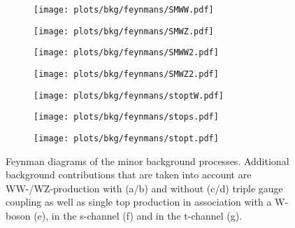\begin{figure}
	\centering
	\begin{subfigure}{0.4\textwidth}
		\texttt{[image: plots/bkg/feynmans/SMWW.pdf]}
		\caption{}
		\label{fig:bkg:fy_WWtgc}
	\end{subfigure}
	\begin{subfigure}{0.4\textwidth}
		\texttt{[image: plots/bkg/feynmans/SMWZ.pdf]}
		\caption{}
		\label{fig:bkg:fy_WZtgc}
	\end{subfigure}
	\begin{subfigure}{0.4\textwidth}
		\texttt{[image: plots/bkg/feynmans/SMWW2.pdf]}
		\caption{}
		\label{fig:bkg:fy_WWSM}
	\end{subfigure}
	\begin{subfigure}{0.4\textwidth}
		\texttt{[image: plots/bkg/feynmans/SMWZ2.pdf]}
		\caption{}
		\label{fig:bkg:fy_WZSM}
	\end{subfigure}
	\begin{subfigure}{0.3\textwidth}
		\texttt{[image: plots/bkg/feynmans/stoptW.pdf]}
		\caption{}
		\label{fig:bkg:fy_stoptw}
	\end{subfigure}
	\begin{subfigure}{0.4\textwidth}
		\texttt{[image: plots/bkg/feynmans/stops.pdf]}
		\caption{}
		\label{fig:bkg:fy_stops}
	\end{subfigure}
	\begin{subfigure}{\textwidth}
		\centering
		\texttt{[image: plots/bkg/feynmans/stopt.pdf]}
		\caption{}
		\label{fig:bkg:fy_stopt}
	\end{subfigure}

	
	\caption[Feynman diagrams of the minor background processes.]{Feynman diagrams of the minor background processes. Additional background contributions that are taken into account are WW-/WZ-production with (a/b) and without (c/d) triple gauge coupling as well as single top production in association with a W-boson (e), in the s-channel (f) and in the t-channel (g).}
\end{figure}

\clearpage
